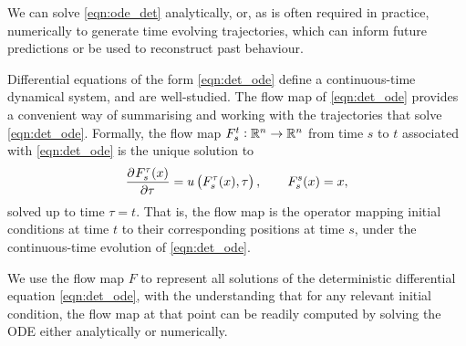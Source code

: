 We can solve \cref{eqn:ode_det} analytically, or, as is often required in practice, numerically to generate time evolving trajectories, which can inform future predictions or be used to reconstruct past behaviour.

Differential equations of the form \eqref{eqn:det_ode} define a continuous-time dynamical system, and are well-studied.
The flow map of \cref{eqn:det_ode} provides a convenient way of summarising and working with the trajectories that solve \cref{eqn:det_ode}.
Formally, the flow map \(F_{s}^{t}: \mathbb{R}^n \to \mathbb{R}^n\) from time \(s\) to \(t\) associated with \cref{eqn:det_ode} is the unique solution to
\begin{equation}
	\dpd{F_{s}^{\tau}(x)}{\tau} = u\left(F_{s}^\tau(x), \tau\right), \qquad F_{s}^{s}(x) = x,
	\label{eqn:flow_map_ode}
\end{equation}
solved up to time \(\tau = t\).
That is, the flow map is the operator mapping initial conditions at time \(t\) to their corresponding positions at time \(s\), under the continuous-time evolution of \cref{eqn:det_ode}.




We use the flow map \(F\) to represent all solutions of the deterministic differential equation \cref{eqn:det_ode}, with the understanding that for any relevant initial condition, the flow map at that point can be readily computed by solving the ODE either analytically or numerically.

